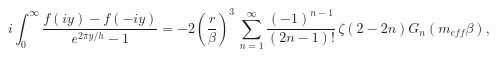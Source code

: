 \begin{equation}
i\int _{0}^{\infty }\frac{f\left(iy\right)-f\left(-iy\right)}{e^{2\pi y/h}-1}=-2\left(\frac{r}{\beta }\right)^{3}\, \sum _{n=1}^{\infty }\frac{\left(-1\right)^{n-1}}{\left(2n-1\right)!}\, \zeta \left(2-2n\right)G_{n}\left(m_{eff}\beta \right),\label{AB-thired term 2}\end{equation}

